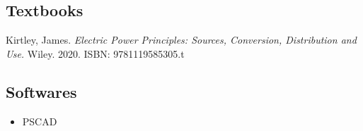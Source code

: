 \subsection*{Textbooks}
Kirtley, James. \textit{Electric Power Principles: Sources, Conversion, Distribution and Use.} Wiley. 2020. ISBN: 9781119585305.t
\subsection*{Softwares}
\begin{itemize}
    \item PSCAD
\end{itemize}
